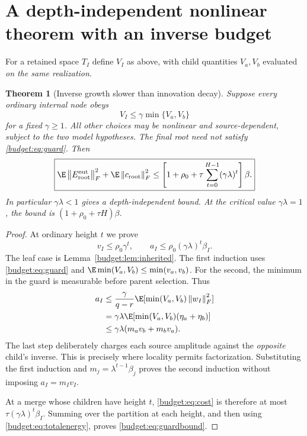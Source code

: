 \documentclass[11pt,oneside,openany,a4paper]{book}
\numberwithin{equation}{chapter}
\newtheorem{theorem}{Theorem}[chapter]
\theoremstyle{definition}
\theoremstyle{remark}
\newcommand{\F}[1]{\left\lVert#1\right\rVert_F}
\begin{document}
\section{A depth-independent nonlinear theorem with an inverse budget}\label{budget:sec:positive}
For a retained space $T_I$ define $V_I$ as above, with child quantities $V_a,V_b$ evaluated \emph{on the same realization}.

\begin{theorem}[Inverse growth slower than innovation decay]\label{budget:thm:guard}
Suppose every ordinary internal node obeys
\begin{equation}\label{budget:eq:guard}
 \boxed{V_I\le\gamma\min\{V_a,V_b\}}
\end{equation}
for a fixed $\gamma\ge1$. All other choices may be nonlinear and source-dependent, subject to the two model hypotheses. The final root need not satisfy \eqref{budget:eq:guard}. Then
\begin{equation}\label{budget:eq:guardbound}
 \boxed{\E\F{E_{\rm root}^{\rm out}}^2+\E\F{c_{\rm root}}^2
 \le\left[1+\rho_0+\tau\sum_{t=0}^{H-1}(\gamma\lambda)^t\right]\beta.}
\end{equation}
In particular $\gamma\lambda<1$ gives a depth-independent bound. At the critical value $\gamma\lambda=1$, the bound is $(1+\rho_0+\tau H)\beta$.
\end{theorem}
\begin{proof}
At ordinary height $t$ we prove
\begin{equation}\label{budget:eq:guardmom}
 v_I\le\rho_0\gamma^t,\qquad
 a_I\le\rho_0(\gamma\lambda)^t\beta_I.
\end{equation}
The leaf case is Lemma~\ref{budget:lem:inherited}. The first induction uses \eqref{budget:eq:guard} and $\E\min(V_a,V_b)\le\min(v_a,v_b)$. For the second, the minimum in the guard is measurable before parent selection. Thus
\begin{align*}
 a_I&\le\frac{\gamma}{q-r}\E[\min(V_a,V_b)\F{w_I}^2]\\
 &=\gamma\lambda\E[\min(V_a,V_b)(\eta_a+\eta_b)]\\
 &\le\gamma\lambda(m_av_b+m_bv_a).
\end{align*}
The last step deliberately charges each source amplitude against the \emph{opposite} child's inverse. This is precisely where locality permits factorization. Substituting the first induction and $m_j=\lambda^{t-1}\beta_j$ proves the second induction without imposing $a_I=m_Iv_I$.

At a merge whose children have height $t$, \eqref{budget:eq:cost} is therefore at most $\tau(\gamma\lambda)^t\beta_I$. Summing over the partition at each height, and then using \eqref{budget:eq:totalenergy}, proves \eqref{budget:eq:guardbound}.
\end{proof}
\end{document}
